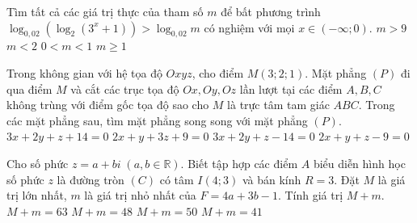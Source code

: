 \begin{ex}%
Tìm tất cả các giá trị thực của tham số $ m $ để bất phương trình $\log_{0,02}\left (\log_2(3^x+1)\right )>\log_{0,02}m $ có nghiệm với mọi $ x\in (-\infty; 0)$.
\choice
{$ m>9 $}
{$ m<2 $}
{$ 0<m<1 $}
{\True $ m\ge 1 $}
\end{ex}

\begin{ex}%
Trong không gian với hệ tọa độ $ Oxyz $, cho điểm $ M(3; 2; 1)$. Mặt phẳng $(P)$ đi qua điểm $ M $ và cắt các trục tọa độ $ Ox, Oy, Oz $ lần lượt tại các điểm $ A, B, C $ không trùng với điểm gốc tọa độ sao cho $ M $ là trực tâm tam giác $ ABC $. Trong các mặt phẳng sau, tìm mặt phẳng song song với mặt phẳng $(P)$.
\choice
{\True $ 3x+2y+z+14=0 $}
{$ 2x+y+3z+9=0 $}
{$ 3x+2y+z-14=0 $}
{$ 2x+y+z-9=0 $}
\end{ex}

\begin{ex}%
Cho số phức $ z=a+bi \;(a, b\in \mathbb{R})$. Biết tập hợp các điểm $ A $ biểu diễn hình học số phức $ z $ là đường tròn $(C)$ có tâm $ I(4; 3)$ và bán kính $ R=3 $. Đặt $ M $ là giá trị lớn nhất, $ m $ là giá trị nhỏ nhất của $ F=4a+3b-1 $. Tính giá trị $ M+m $.
\choice
{$ M+m=63 $}
{\True $ M+m=48 $}
{$ M+m=50 $}
{$ M+m=41 $}
\end{ex}

